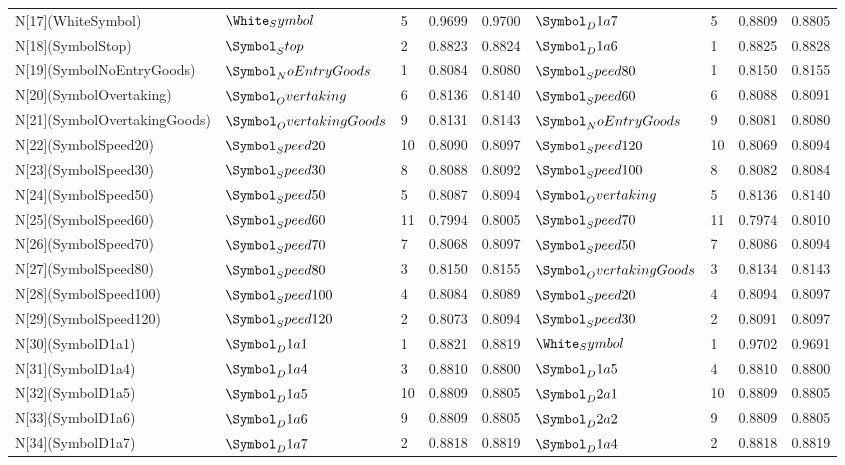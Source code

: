 \begin{tabular}{lllllllll}
N[17](WhiteSymbol) & $\White_Symbol$ & 5 & 0.9699 & 0.9700 & $\Symbol_D1a7$ & 5 & 0.8809 & 0.8805 \\
N[18](SymbolStop) & $\Symbol_Stop$ & 2 & 0.8823 & 0.8824 & $\Symbol_D1a6$ & 1 & 0.8825 & 0.8828 \\
N[19](SymbolNoEntryGoods) & $\Symbol_NoEntryGoods$ & 1 & 0.8084 & 0.8080 & $\Symbol_Speed80$ & 1 & 0.8150 & 0.8155 \\
N[20](SymbolOvertaking) & $\Symbol_Overtaking$ & 6 & 0.8136 & 0.8140 & $\Symbol_Speed60$ & 6 & 0.8088 & 0.8091 \\
N[21](SymbolOvertakingGoods) & $\Symbol_OvertakingGoods$ & 9 & 0.8131 & 0.8143 & $\Symbol_NoEntryGoods$ & 9 & 0.8081 & 0.8080 \\
N[22](SymbolSpeed20) & $\Symbol_Speed20$ & 10 & 0.8090 & 0.8097 & $\Symbol_Speed120$ & 10 & 0.8069 & 0.8094 \\
N[23](SymbolSpeed30) & $\Symbol_Speed30$ & 8 & 0.8088 & 0.8092 & $\Symbol_Speed100$ & 8 & 0.8082 & 0.8084 \\
N[24](SymbolSpeed50) & $\Symbol_Speed50$ & 5 & 0.8087 & 0.8094 & $\Symbol_Overtaking$ & 5 & 0.8136 & 0.8140 \\
N[25](SymbolSpeed60) & $\Symbol_Speed60$ & 11 & 0.7994 & 0.8005 & $\Symbol_Speed70$ & 11 & 0.7974 & 0.8010 \\
N[26](SymbolSpeed70) & $\Symbol_Speed70$ & 7 & 0.8068 & 0.8097 & $\Symbol_Speed50$ & 7 & 0.8086 & 0.8094 \\
N[27](SymbolSpeed80) & $\Symbol_Speed80$ & 3 & 0.8150 & 0.8155 & $\Symbol_OvertakingGoods$ & 3 & 0.8134 & 0.8143 \\
N[28](SymbolSpeed100) & $\Symbol_Speed100$ & 4 & 0.8084 & 0.8089 & $\Symbol_Speed20$ & 4 & 0.8094 & 0.8097 \\
N[29](SymbolSpeed120) & $\Symbol_Speed120$ & 2 & 0.8073 & 0.8094 & $\Symbol_Speed30$ & 2 & 0.8091 & 0.8097 \\
N[30](SymbolD1a1) & $\Symbol_D1a1$ & 1 & 0.8821 & 0.8819 & $\White_Symbol$ & 1 & 0.9702 & 0.9691 \\
N[31](SymbolD1a4) & $\Symbol_D1a4$ & 3 & 0.8810 & 0.8800 & $\Symbol_D1a5$ & 4 & 0.8810 & 0.8800 \\
N[32](SymbolD1a5) & $\Symbol_D1a5$ & 10 & 0.8809 & 0.8805 & $\Symbol_D2a1$ & 10 & 0.8809 & 0.8805 \\
N[33](SymbolD1a6) & $\Symbol_D1a6$ & 9 & 0.8809 & 0.8805 & $\Symbol_D2a2$ & 9 & 0.8809 & 0.8805 \\
N[34](SymbolD1a7) & $\Symbol_D1a7$ & 2 & 0.8818 & 0.8819 & $\Symbol_D1a4$ & 2 & 0.8818 & 0.8819 \\

\end{tabular}
